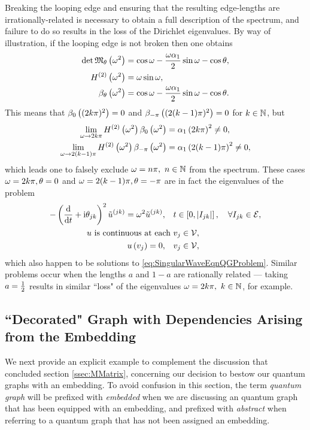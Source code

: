 Breaking the looping edge and ensuring that the resulting edge-lengths are irrationally-related is necessary to obtain a full description of the spectrum, and failure to do so results in the loss of the Dirichlet eigenvalues.
By way of illustration, if the looping edge is not broken then one obtains
\begin{align*}
	\det\mathfrak{M}_{\theta}\left( \omega^2 \right) &= \cos\omega - \frac{\omega\alpha_1}{2}\sin\omega - \cos\theta, \\
	H^{(2)}\left( \omega^2 \right) &= \omega\sin\omega, \\
	\beta_{\theta}\left( \omega^2 \right) &= \cos\omega - \frac{\omega\alpha_1}{2}\sin\omega - \cos\theta.
\end{align*}
This means that $\beta_{0}\left( (2k\pi)^2 \right)=0$ and $\beta_{-\pi}\left( (2(k-1)\pi)^2 \right)=0$ for $k\in\mathbb{N}$, but 
\begin{align*}
	\lim_{\omega\rightarrow 2k\pi}H^{(2)}\left( \omega^2 \right)\beta_{0}\left( \omega^2 \right) &= \alpha_1\left( 2k\pi \right)^2 \neq 0, \\
	\lim_{\omega\rightarrow 2(k-1)\pi} H^{(2)}\left( \omega^2 \right)\beta_{-\pi}\left( \omega^2 \right) &= \alpha_1\left( 2(k-1)\pi \right)^2 \neq 0,
\end{align*}
which leads one to falsely exclude $\omega=n\pi, \ n\in\mathbb{N}$ from the spectrum.
These cases $\omega=2k\pi, \theta=0$ and $\omega=2(k-1)\pi, \theta=-\pi$ are in fact the eigenvalues of the problem
\begin{align*}
	-\left( \dfrac{\mathrm{d}}{\mathrm{d}t} + \mathrm{i}\theta_{jk} \right)^2 \tilde{u}^{(jk)} = \omega^2 \tilde{u}^{(jk)}, \quad &t\in\left[ 0,\left\lvert I_{jk} \right\rvert \right], \quad \forall I_{jk}\in \mathcal{E}, \\
	u \text{ is continuous at each } &v_j \in \mathcal{V}, \\
	u\left( v_j \right) = 0, \quad &v_j\in\mathcal{V},
\end{align*}
which also happen to be solutions to \eqref{eq:SingularWaveEqnQGProblem}.
Similar problems occur when the lengths $a$ and $1-a$ are rationally related --- taking $a=\frac{1}{2}$ results in similar ``loss" of the eigenvalues $\omega=2k\pi, \ k\in\naturals$, for example.

\subsection{``Decorated" Graph with Dependencies Arising from the Embedding} \label{ssec:EmbeddingDependentExample}
We next provide an explicit example to complement the discussion that concluded section \ref{ssec:MMatrix}, concerning our decision to bestow our quantum graphs with an embedding. 
To avoid confusion in this section, the term \emph{quantum graph} will be prefixed with \emph{embedded} when we are discussing an quantum graph that has been equipped with an embedding, and prefixed with \emph{abstract} when referring to a quantum graph that has not been assigned an embedding.

